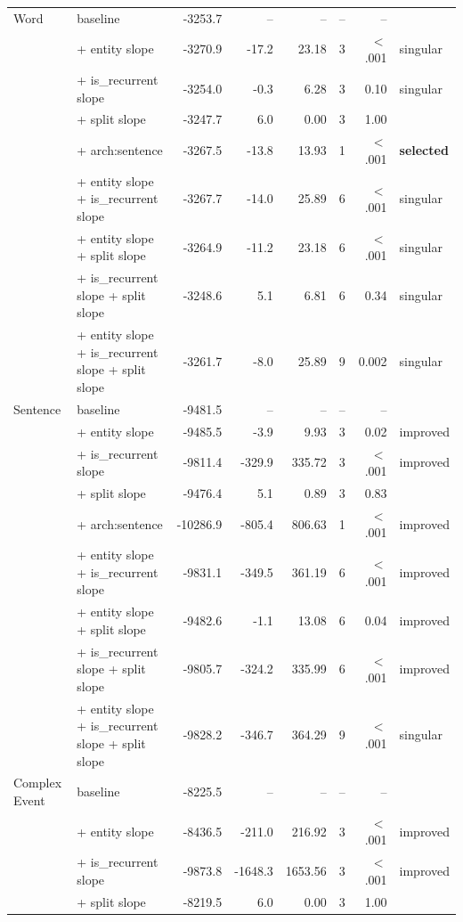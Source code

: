 \begin{longtable}{@{}llrrrrrl@{}}
\bottomrule
\endlastfoot
Word & baseline & -3253.7 & -- & -- & -- & -- &  \\
 & + entity slope & -3270.9 & -17.2 & 23.18 & 3 & $<$.001 & singular \\
 & + is\_recurrent slope & -3254.0 & -0.3 & 6.28 & 3 & 0.10 & singular \\
 & + split slope & -3247.7 & 6.0 & 0.00 & 3 & 1.00 &  \\
 & + arch:sentence & -3267.5 & -13.8 & 13.93 & 1 & $<$.001 & \textbf{selected} \\
 & + entity slope + is\_recurrent slope & -3267.7 & -14.0 & 25.89 & 6 & $<$.001 & singular \\
 & + entity slope + split slope & -3264.9 & -11.2 & 23.18 & 6 & $<$.001 & singular \\
 & + is\_recurrent slope + split slope & -3248.6 & 5.1 & 6.81 & 6 & 0.34 & singular \\
 & + entity slope + is\_recurrent slope + split slope & -3261.7 & -8.0 & 25.89 & 9 & 0.002 & singular \\
\addlinespace
Sentence & baseline & -9481.5 & -- & -- & -- & -- &  \\
 & + entity slope & -9485.5 & -3.9 & 9.93 & 3 & 0.02 & improved \\
 & + is\_recurrent slope & -9811.4 & -329.9 & 335.72 & 3 & $<$.001 & improved \\
 & + split slope & -9476.4 & 5.1 & 0.89 & 3 & 0.83 &  \\
 & + arch:sentence & -10286.9 & -805.4 & 806.63 & 1 & $<$.001 & improved \\
 & + entity slope + is\_recurrent slope & -9831.1 & -349.5 & 361.19 & 6 & $<$.001 & improved \\
 & + entity slope + split slope & -9482.6 & -1.1 & 13.08 & 6 & 0.04 & improved \\
 & + is\_recurrent slope + split slope & -9805.7 & -324.2 & 335.99 & 6 & $<$.001 & improved \\
 & + entity slope + is\_recurrent slope + split slope & -9828.2 & -346.7 & 364.29 & 9 & $<$.001 & singular \\
\addlinespace
Complex Event & baseline & -8225.5 & -- & -- & -- & -- &  \\
 & + entity slope & -8436.5 & -211.0 & 216.92 & 3 & $<$.001 & improved \\
 & + is\_recurrent slope & -9873.8 & -1648.3 & 1653.56 & 3 & $<$.001 & improved \\
 & + split slope & -8219.5 & 6.0 & 0.00 & 3 & 1.00 &  \\

\end{longtable}
